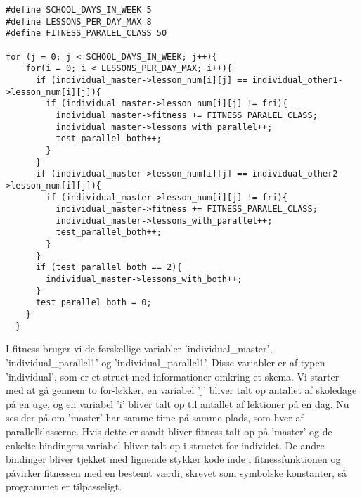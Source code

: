\begin{lstlisting}
#define SCHOOL_DAYS_IN_WEEK 5
#define LESSONS_PER_DAY_MAX 8
#define FITNESS_PARALEL_CLASS 50

for (j = 0; j < SCHOOL_DAYS_IN_WEEK; j++){
    for(i = 0; i < LESSONS_PER_DAY_MAX; i++){
      if (individual_master->lesson_num[i][j] == individual_other1->lesson_num[i][j]){
        if (individual_master->lesson_num[i][j] != fri){
          individual_master->fitness += FITNESS_PARALEL_CLASS;
          individual_master->lessons_with_parallel++;
          test_parallel_both++;
        }
      }
      if (individual_master->lesson_num[i][j] == individual_other2->lesson_num[i][j]){
        if (individual_master->lesson_num[i][j] != fri){
          individual_master->fitness += FITNESS_PARALEL_CLASS;
          individual_master->lessons_with_parallel++;
          test_parallel_both++;
        }
      }
      if (test_parallel_both == 2){
        individual_master->lessons_with_both++;
      }
      test_parallel_both = 0;
    }
  }
\end{lstlisting}

I fitness bruger vi de forskellige variabler ’individual\_master’, ’individual\_parallel1’ og ’individual\_parallel1’. Disse variabler er af typen ’individual’, som er et struct med informationer omkring et skema.
Vi starter med at gå gennem to for-løkker, en variabel ’j’ bliver talt op antallet af skoledage på en uge, og en variabel ’i’ bliver talt op til antallet af lektioner på en dag. Nu ses der på om ’master’ har samme time på samme plads, som hver af parallelklasserne. Hvis dette er sandt bliver fitness talt op på ’master’ og de enkelte bindingers variabel bliver talt op i structet for individet.
De andre bindinger bliver tjekket med lignende stykker kode inde i fitnessfunktionen og påvirker fitnessen med en bestemt værdi, skrevet som symbolske konstanter, så programmet er tilpasseligt.
